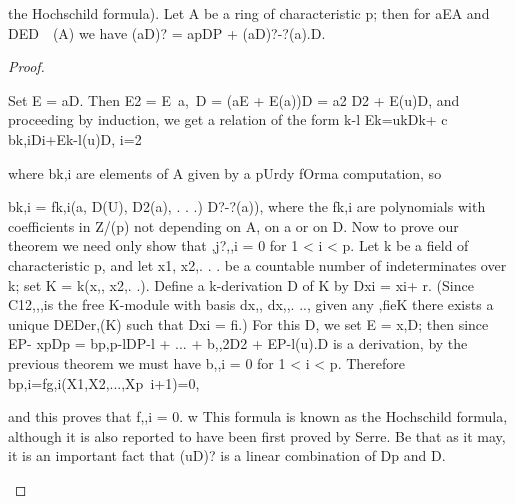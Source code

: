 \begin{theorem}[Theorem 25.5]\label{mcrt-auto-theorem-25-5}\uses{}
\begin{mathematicalrecord}
the Hochschild formula). Let A be a ring of characteristic
p; then for aEA and DED~~(A) we have
         (aD)? = apDP + (aD)?-?(a).D.
\end{mathematicalrecord}
\end{theorem}
\begin{proof}
\begin{mathematicalrecord}
Set E = aD. Then E2 = E~a,~D = (aE + E(a))D = a2 D2 + E(u)D,
and proceeding by induction, we get a relation of the form
                                           k-l
         Ek=ukDk+                           c bk,iDi+Ek-l(u)D,
                                           i=2

where bk,i are elements of A given                               by a pUrdy       fOrma   computation,     so

         bk,i         = fk,i(a,           D(U),   D2(a), . . .) D?-?(a)),
where the fk,i are polynomials with coefficients in Z/(p) not depending on
A, on a or on D. Now to prove our theorem we need only show that ,j?,,i = 0
for 1 < i < p. Let k be a field of characteristic p, and let x1, x2,. . . be a
countable number of indeterminates over k; set K = k(x,, x2,. .). Define
a k-derivation D of K by Dxi = xi+ r. (Since C12,,,is the free K-module with
basis dx,, dx,,. .., given any ,fieK there exists a unique DEDer,(K)
such that Dxi = fi.) For this D, we set E = x,D; then since EP- xpDp =
bp,p-lDP-l + ... + b,,2D2 + EP-l(u).D is a derivation, by the previous
theorem we must have b,,i = 0 for 1 < i < p. Therefore
         bp,i=fg,i(X1,X2,...,Xp~i+1)=0,


and this proves that f,,i = 0. w
  This formula is known as the Hochschild formula, although it is also
reported to have been first proved by Serre. Be that as it may, it is an
important fact that (uD)? is a linear combination of Dp and D.
\end{mathematicalrecord}
\end{proof}


